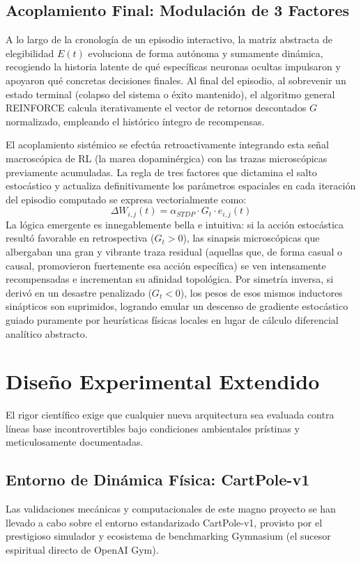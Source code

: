 \documentclass[a4paper,12pt,twocolumn]{article}
\begin{document}
\subsection{Acoplamiento Final: Modulación de 3 Factores}
A lo largo de la cronología de un episodio interactivo, la matriz abstracta de elegibilidad $E(t)$ evoluciona de forma autónoma y sumamente dinámica, recogiendo la historia latente de qué específicas neuronas ocultas impulsaron y apoyaron qué concretas decisiones finales. Al final del episodio, al sobrevenir un estado terminal (colapso del sistema o éxito mantenido), el algoritmo general REINFORCE calcula iterativamente el vector de retornos descontados $G$ normalizado, empleando el histórico íntegro de recompensas.

El acoplamiento sistémico se efectúa retroactivamente integrando esta señal macroscópica de RL (la marea dopaminérgica) con las trazas microscópicas previamente acumuladas. La regla de tres factores que dictamina el salto estocástico y actualiza definitivamente los parámetros espaciales en cada iteración del episodio computado se expresa vectorialmente como:
\begin{equation}
    \Delta W_{i,j}(t) = \alpha_{STDP} \cdot G_t \cdot e_{i,j}(t)
\end{equation}
La lógica emergente es innegablemente bella e intuitiva: si la acción estocástica resultó favorable en retrospectiva ($G_t > 0$), las sinapsis microscópicas que albergaban una gran y vibrante traza residual (aquellas que, de forma casual o causal, promovieron fuertemente esa acción específica) se ven intensamente recompensadas e incrementan su afinidad topológica. Por simetría inversa, si derivó en un desastre penalizado ($G_t < 0$), los pesos de esos mismos inductores sinápticos son suprimidos, logrando emular un descenso de gradiente estocástico guiado puramente por heurísticas físicas locales en lugar de cálculo diferencial analítico abstracto.

\section{Diseño Experimental Extendido}
El rigor científico exige que cualquier nueva arquitectura sea evaluada contra líneas base incontrovertibles bajo condiciones ambientales prístinas y meticulosamente documentadas.

\subsection{Entorno de Dinámica Física: CartPole-v1}
Las validaciones mecánicas y computacionales de este magno proyecto se han llevado a cabo sobre el entorno estandarizado CartPole-v1, provisto por el prestigioso simulador y ecosistema de benchmarking Gymnasium (el sucesor espiritual directo de OpenAI Gym). 
\end{document}
